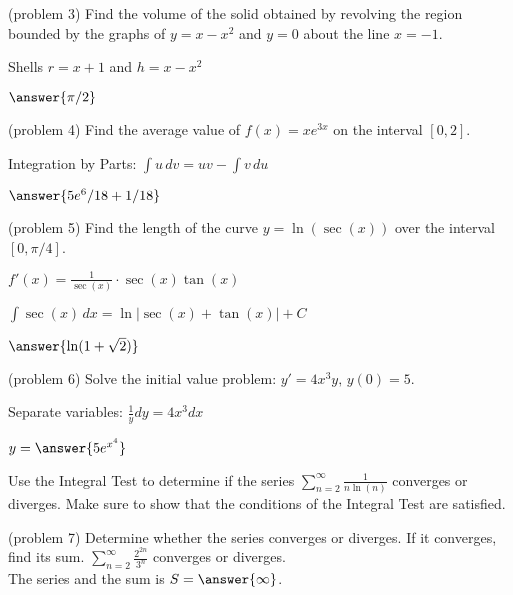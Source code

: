 \documentclass[handout]{ximera}
\begin{document}
\begin{problem}(problem 3)
Find the volume of the solid obtained by revolving the region bounded by the 
graphs of $y = x-x^2$ and $y = 0$ about the line $x = -1$.\\
\begin{hint}
Shells $r = x+1$ and $h = x-x^2$
\end{hint}
$\answer{\pi/2}$
\end{problem}


\begin{problem}(problem 4)
Find the average value of $f(x) = xe^{3x}$ on the interval $[0, 2]$.\\
\begin{hint}
Integration by Parts: $\int u \, dv = uv - \int v \, du$
\end{hint}
$\answer{5e^6/18  + 1/18}$
\end{problem}


\begin{problem}(problem 5)
Find the length of the curve $\displaystyle y = \ln(\sec(x))$ over the interval $[0, \pi/4]$.\\
\begin{hint}
$f'(x) = \frac{1}{\sec(x)} \cdot \sec(x)\tan(x)$
\end{hint}
\begin{hint}
$\int \sec(x) \, dx = \ln|\sec(x) + \tan(x)| + C$
\end{hint}
$\answer{\ln(1 + \sqrt{2})}$
\end{problem}


\begin{problem}(problem 6)
Solve the initial value problem: $\displaystyle y' = 4x^3 y,\, y(0) = 5$.\\
\begin{hint}
Separate variables: $\frac{1}{y} dy = 4x^3 dx$
\end{hint}
$y = \answer{5e^{x^4}}$
\end{problem}


Use the Integral Test to determine if the series $\displaystyle \sum_{n=2}^\infty \frac{1}{n\ln(n)}$
converges or diverges. Make sure to show that the
conditions of the Integral Test are satisfied.\\

\begin{problem}(problem 7)
Determine whether the series converges or diverges.  If it converges, find its sum. $\displaystyle \sum_{n=2}^\infty \frac{2^{2n}}{3^n}$
converges or diverges.\\
The series  and the sum is $S = \answer{\infty}$.
\end{problem}
\end{document}
